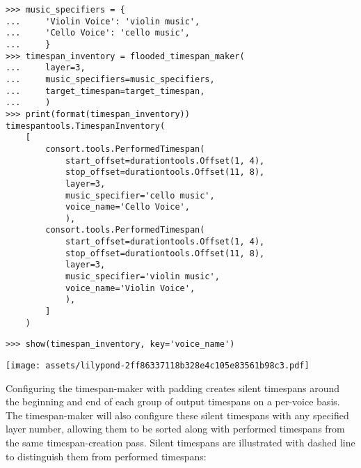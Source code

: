 \begin{abjadbookoutput}
\begin{singlespacing}
\vspace{-0.5\baselineskip}
\begin{lstlisting}
>>> music_specifiers = {
...     'Violin Voice': 'violin music',
...     'Cello Voice': 'cello music',
...     }
>>> timespan_inventory = flooded_timespan_maker(
...     layer=3,
...     music_specifiers=music_specifiers,
...     target_timespan=target_timespan,
...     )
>>> print(format(timespan_inventory))
timespantools.TimespanInventory(
    [
        consort.tools.PerformedTimespan(
            start_offset=durationtools.Offset(1, 4),
            stop_offset=durationtools.Offset(11, 8),
            layer=3,
            music_specifier='cello music',
            voice_name='Cello Voice',
            ),
        consort.tools.PerformedTimespan(
            start_offset=durationtools.Offset(1, 4),
            stop_offset=durationtools.Offset(11, 8),
            layer=3,
            music_specifier='violin music',
            voice_name='Violin Voice',
            ),
        ]
    )
\end{lstlisting}
\begin{lstlisting}
>>> show(timespan_inventory, key='voice_name')
\end{lstlisting}
\noindent\texttt{[image: assets/lilypond-2ff86337118b328e4c105e83561b98c3.pdf]}
\end{singlespacing}
\end{abjadbookoutput}

\noindent Configuring the timespan-maker with padding creates silent timespans
around the beginning and end of each group of output timespans on a per-voice
basis. The timespan-maker will also configure these silent timespans with any
specified layer number, allowing them to be sorted along with performed
timespans from the same timespan-creation pass. Silent timespans are
illustrated with dashed line to distinguish them from performed timespans:

\begin{comment}
<abjad>
flooded_timespan_maker = consort.FloodedTimespanMaker(
    padding=Duration(1, 4),
    timespan_specifier=consort.TimespanSpecifier(
        minimum_duration=Duration(1, 8),
        ),
    )
timespan_inventory = flooded_timespan_maker(
    layer=5,
    music_specifiers=music_specifiers,
    target_timespan=target_timespan,
    )
print(format(timespan_inventory))
show(timespan_inventory, key='voice_name')
</abjad>
\end{comment}

